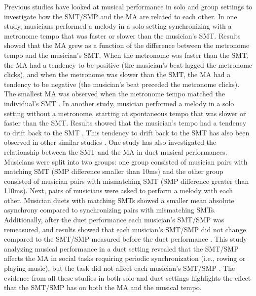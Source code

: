 \documentclass{report}
\begin{document}
Previous studies have looked at musical performance in solo and group settings to investigate how the SMT/SMP and the MA are related to each other. In one study, musicians performed a melody in a solo setting synchronizing with a metronome tempo that was faster or slower than the musician's SMT. Results showed that the MA grew as a function of the difference between the metronome tempo and the musician's SMT. When the metronome was faster than the SMT, the MA had a tendency to be positive (the musician's beat lagged the metronome clicks), and when the metronome was slower than the SMT, the MA had a tendency to be negative (the musician's beat preceded the metronome clicks). The smallest MA was observed when the metronome tempo matched the individual's SMT \cite{scheurich2018tapping}. In another study, musician performed a melody in a solo setting without a metronome, starting at spontaneous tempo that was slower or faster than the SMT. Results showed that the musician's tempo had a tendency to drift back to the SMT \cite{zamm2018musicians}. This tendency to drift back to the SMT has also been observed in other similar studies \cite{mcauley2006time, yu2003task}. One study has also investigated the relationship between the SMT and the MA in duet musical performances. Musicians were split into two groups: one group consisted of musician pairs with matching SMT (SMP difference smaller than 10ms) and the other group consisted of musician pairs with mismatching SMT (SMP difference greater than 110ms). Next, pairs of musicians were asked to perform a melody with each other. Musician duets with matching SMTs showed a smaller mean absolute asynchrony compared to synchronizing pairs with mismatching SMTs. Additionally, after the duet performance each musician's SMT/SMP was remeasured, and results showed that each musician's SMT/SMP did not change compared to the SMT/SMP measured before the duet performance \cite{zamm2016endogenous}. This study analyzing musical performance in a duet setting revealed that the SMT/SMP affects the MA in social tasks requiring periodic synchronization (i.e., rowing or playing music), but the task did not affect each musician's SMT/SMP \cite{zamm2016endogenous}. The evidence from all these studies in both solo and duet settings highlights the effect that the SMT/SMP has on both the MA and the musical tempo.
\end{document}
